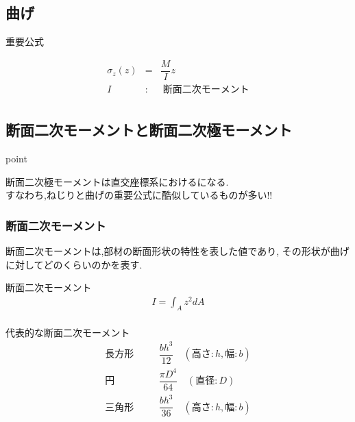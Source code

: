 \documentclass[a4paper]{jsarticle}
\begin{document}
\subsection{曲げ}
\begin{itembox}[l]{重要公式}
    \begin{center}
        \begin{eqnarray*}
            \sigma_z\left(z\right)&=&\dfrac{M}{I}z\\
            I&:&\;断面二次モーメント\\
        \end{eqnarray*}
    \end{center}
\end{itembox}
\subsection{断面二次モーメントと断面二次極モーメント}
\begin{itembox}[l]{point}
    \begin{center}
        断面二次極モーメントは直交座標系におけるになる.\\
        すなわち,ねじりと曲げの重要公式に酷似しているものが多い!!
    \end{center}
\end{itembox}
\subsubsection{断面二次モーメント}
断面二次モーメントは,部材の断面形状の特性を表した値であり,
その形状が曲げに対してどのくらいのかを表す.
\begin{itembox}[l]{断面二次モーメント}
    \begin{eqnarray*}
        \displaystyle I=\int_Az^2dA\\
    \end{eqnarray*}
\end{itembox}
\begin{itembox}[l]{代表的な断面二次モーメント}
    \begin{eqnarray*}
        長方形\quad&&\dfrac{bh^3}{12}\quad(高さ:h,幅:b)\\
        円\qquad&&\dfrac{\pi D^4}{64}\quad(直径:D)\\
        三角形\quad&&\dfrac{bh^3}{36}\quad(高さ:h,幅:b)\\
    \end{eqnarray*}
\end{itembox}
\end{document}
